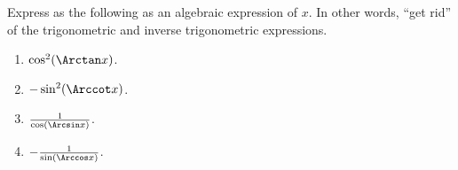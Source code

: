 Express as the following as an algebraic expression of $x$. In other words, ``get rid'' of the trigonometric and inverse trigonometric expressions.

\begin{enumerate}
\item $\cos^2(\Arctan x)$. 

\item $-\sin^2(\Arccot x)$. 

\item $\frac{1}{\cos(\Arcsin x)}$. 

\item $-\frac{1}{\sin(\Arccos x)}$.

\end{enumerate}
